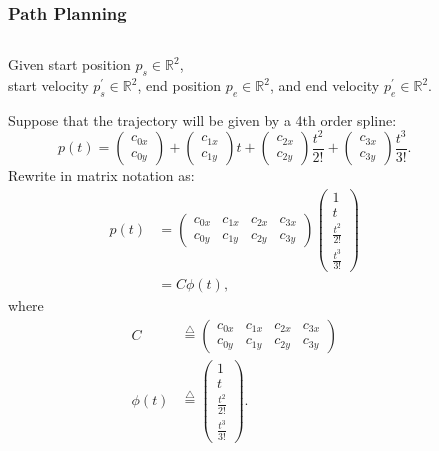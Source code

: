 \documentclass{beamer}
\newcommand{\defeq}{\stackrel{\triangle}{=}}
\begin{document}
\begin{frame}
\frametitle{Path Planning}	
\begin{columns}
\begin{column}{0.8\textwidth}
   Given start position $p_s\in\mathbb{R}^2$, \\
    start velocity $p_s^{'} \in\mathbb{R}^2$, 
    end position $p_e\in\mathbb{R}^2$, and 
    end velocity $p_e^{'}\in\mathbb{R}^2$.
   
   Suppose that the trajectory will be given by a 4th order spline:
   \[
   p(t) = \begin{pmatrix} c_{0x} \\ c_{0y} \end{pmatrix} + \begin{pmatrix} c_{1x} \\ c_{1y} \end{pmatrix} t + \begin{pmatrix} c_{2x} \\ c_{2y} \end{pmatrix} \frac{t^2}{2!} + \begin{pmatrix} c_{3x} \\ c_{3y} \end{pmatrix} \frac{t^3}{3!}.
   \]
   Rewrite in matrix notation as:
   \begin{align*}
   p(t) &= \begin{pmatrix} c_{0x} & c_{1x} & c_{2x} & c_{3x} \\ c_{0y} & c_{1y} & c_{2y} & c_{3y} \end{pmatrix} \begin{pmatrix} 1 \\ t \\  \frac{t^2}{2!} \\ \frac{t^3}{3!} \end{pmatrix} \\
   	    &= C \phi(t),
   \end{align*}
   where
   \begin{align*}
   C &\defeq	\begin{pmatrix} c_{0x} & c_{1x} & c_{2x} & c_{3x} \\ c_{0y} & c_{1y} & c_{2y} & c_{3y} \end{pmatrix}  \\
   \phi(t) &\defeq \begin{pmatrix} 1 \\ t \\  \frac{t^2}{2!} \\ \frac{t^3}{3!} \end{pmatrix}.
   \end{align*}

\end{column}
\begin{column}{0.2\textwidth}  
\end{column}
\end{columns}
\end{frame}
\end{document}

